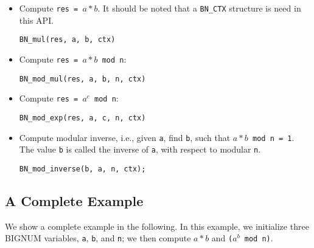 \begin{itemize}
\item Compute \texttt{res = $a * b$}. It should be noted that a 
\texttt{BN\_CTX} structure is need in this API. 

\begin{lstlisting}
BN_mul(res, a, b, ctx)
\end{lstlisting}
 

\item Compute \texttt{res = $a * b$  mod n}:

\begin{lstlisting}
BN_mod_mul(res, a, b, n, ctx)
\end{lstlisting}
 


\item Compute \texttt{res = $a^c$ mod n}:

\begin{lstlisting}
BN_mod_exp(res, a, c, n, ctx)
\end{lstlisting}


\item Compute modular inverse, i.e., given \texttt{a}, find \texttt{b}, 
such that \texttt{$a * b$  mod n = 1}. The value \texttt{b} is called
the inverse of \texttt{a}, with respect to modular \texttt{n}.  
 
\begin{lstlisting}
BN_mod_inverse(b, a, n, ctx);
\end{lstlisting}
 

\end{itemize}
 
 

\subsection{A Complete Example}

We show a complete example in the following. In this example, we 
initialize three BIGNUM variables, \texttt{a}, \texttt{b}, and \texttt{n};
we then compute $a*b$ and \texttt{($a^b$ mod n)}.

